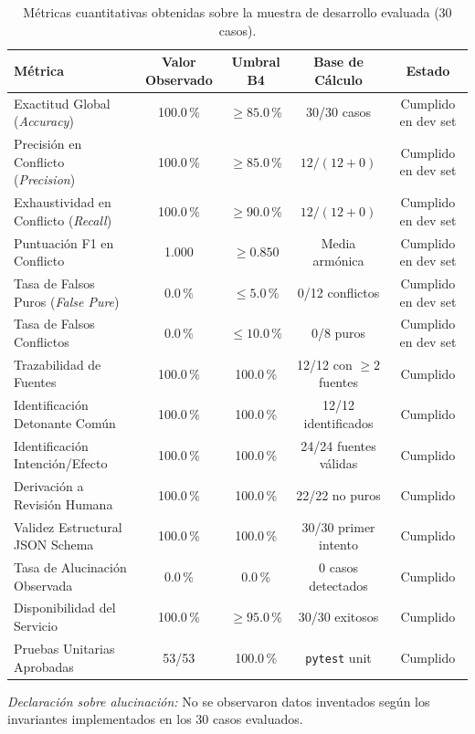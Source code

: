 \documentclass[11pt,a4paper]{article}
\begin{document}
\begin{table}[H]
\centering
\small
\caption{Métricas cuantitativas obtenidas sobre la muestra de desarrollo evaluada (30 casos).}
\label{tab:metricas_b4}
\begin{tabularx}{\textwidth}{Xcccc}
\toprule
\textbf{Métrica} & \textbf{Valor Observado} & \textbf{Umbral B4} & \textbf{Base de Cálculo} & \textbf{Estado} \\
\midrule
Exactitud Global (\textit{Accuracy}) & 100.0\,\% & $\ge 85.0$\,\% & 30/30 casos & Cumplido en dev set \\
Precisión en Conflicto (\textit{Precision}) & 100.0\,\% & $\ge 85.0$\,\% & $12 / (12 + 0)$ & Cumplido en dev set \\
Exhaustividad en Conflicto (\textit{Recall}) & 100.0\,\% & $\ge 90.0$\,\% & $12 / (12 + 0)$ & Cumplido en dev set \\
Puntuación F1 en Conflicto & 1.000 & $\ge 0.850$ & Media armónica & Cumplido en dev set \\
Tasa de Falsos Puros (\textit{False Pure}) & 0.0\,\% & $\le 5.0$\,\% & 0/12 conflictos & Cumplido en dev set \\
Tasa de Falsos Conflictos & 0.0\,\% & $\le 10.0$\,\% & 0/8 puros & Cumplido en dev set \\
Trazabilidad de Fuentes & 100.0\,\% & 100.0\,\% & 12/12 con $\ge 2$ fuentes & Cumplido \\
Identificación Detonante Común & 100.0\,\% & 100.0\,\% & 12/12 identificados & Cumplido \\
Identificación Intención/Efecto & 100.0\,\% & 100.0\,\% & 24/24 fuentes válidas & Cumplido \\
Derivación a Revisión Humana & 100.0\,\% & 100.0\,\% & 22/22 no puros & Cumplido \\
Validez Estructural JSON Schema & 100.0\,\% & 100.0\,\% & 30/30 primer intento & Cumplido \\
Tasa de Alucinación Observada & 0.0\,\% & 0.0\,\% & 0 casos detectados & Cumplido \\
Disponibilidad del Servicio & 100.0\,\% & $\ge 95.0$\,\% & 30/30 exitosos & Cumplido \\
Pruebas Unitarias Aprobadas & 53/53 & 100.0\,\% & \texttt{pytest} unit & Cumplido \\
\bottomrule
\end{tabularx}
\end{table}

\noindent\textit{Declaración sobre alucinación:} No se observaron datos inventados según los invariantes implementados en los 30 casos evaluados.
\end{document}
